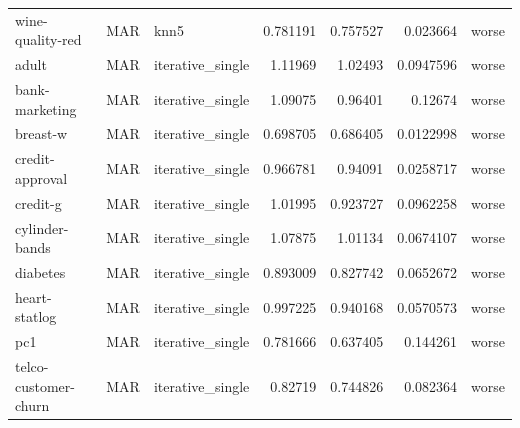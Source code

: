 \begin{table}[ht]
\begin{tabular}{lllrrrl}
 wine-quality-red     & MAR         & knn5             &                                 0.781191 &                             0.757527 &                     0.023664   & worse                \\
 adult                & MAR         & iterative\_single &                                 1.11969  &                             1.02493  &                     0.0947596  & worse                \\
 bank-marketing       & MAR         & iterative\_single &                                 1.09075  &                             0.96401  &                     0.12674    & worse                \\
 breast-w             & MAR         & iterative\_single &                                 0.698705 &                             0.686405 &                     0.0122998  & worse                \\
 credit-approval      & MAR         & iterative\_single &                                 0.966781 &                             0.94091  &                     0.0258717  & worse                \\
 credit-g             & MAR         & iterative\_single &                                 1.01995  &                             0.923727 &                     0.0962258  & worse                \\
 cylinder-bands       & MAR         & iterative\_single &                                 1.07875  &                             1.01134  &                     0.0674107  & worse                \\
 diabetes             & MAR         & iterative\_single &                                 0.893009 &                             0.827742 &                     0.0652672  & worse                \\
 heart-statlog        & MAR         & iterative\_single &                                 0.997225 &                             0.940168 &                     0.0570573  & worse                \\
 pc1                  & MAR         & iterative\_single &                                 0.781666 &                             0.637405 &                     0.144261   & worse                \\
 telco-customer-churn & MAR         & iterative\_single &                                 0.82719  &                             0.744826 &                     0.082364   & worse                \\

\end{tabular}
\end{table}
